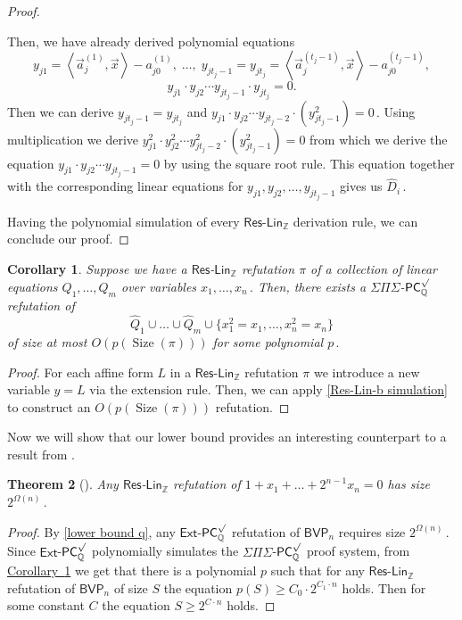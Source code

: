 \documentclass[11pt]{article}
\newcommand{\expref}[2]{\texorpdfstring{\hyperref[#2]{#1~\ref{#2}}}{#1~\ref{#2}}}
\newtheorem{theorem}{Theorem}[section]
\newtheorem{corollary}[theorem]{Corollary}
\newcommand{\Q}{{\mathbb Q}}
\newcommand{\Z}{{\mathbb Z}}
\DeclareMathOperator{\Size}{\mathrm{Size}}
\begin{document}
\begin{proof}
\begin{itemize}
    Then, we have already derived polynomial equations 
    $$
    y_{j 1} = \left\langle \vec a_j^{(1)}, \vec x \right \rangle - a_{j 0}^{(1)}, \; \ldots, \; y_{j t_{j} - 1} = y_{j t_j} = \left\langle \vec a_j^{(t_{j} - 1)}, \vec x \right \rangle - a_{j 0}^{(t_j - 1)},
    $$
    $$
    y_{j 1} \cdot y_{j 2} \cdots y_{j t_j - 1} \cdot y_{j t_j} = 0.
    $$
    Then we can derive $y_{j t_j - 1} = y_{j t_j}$ and %
$y_{j 1} \cdot y_{j 2} \cdots y_{j t_j - 2} \cdot (y_{j t_j - 1}^2) = 0\,.$ %
 Using multiplication we derive  $y_{j 1}^2 \cdot y_{j 2}^2 \cdots y_{j t_j - 2}^2 \cdot (y_{j t_j - 1}^2) = 0$ from which we derive the equation $y_{j 1} \cdot y_{j 2} \cdots y_{j t_j - 1} = 0$ by using the square root rule. This equation together with the corresponding linear equations for  $y_{j 1}, y_{j 2}, \ldots, y_{j t_j - 1}$ gives us %
$\widehat{D}_i\,.$ %
\end{itemize}
Having the polynomial simulation of every $\mathsf{Res}$-$\mathsf{Lin}_\Z$ derivation rule, we can conclude our proof.\end{proof}



\begin{corollary}\label{cor:SPS-PC sim of res-lin}
Suppose we have a  $\mathsf{Res}$-$\mathsf{Lin}_\Z$ refutation $\pi$ of a collection of linear equations $Q_1, \ldots, Q_m$ over variables %
$x_1, \ldots, x_n\,.$ %
  Then, there exists a $\Sigma \Pi \Sigma$-$\mathsf{PC}_\Q^{\surd}$ refutation of
$$
\widehat{Q}_1 \cup \ldots \cup \widehat{Q}_m  \cup \{x_1^2 = x_1, \ldots, x_n^2 = x_n\}
$$ 
of size at most $O(p(\Size(\pi)))$ for some polynomial %
$p\,.$ %
\end{corollary}
\begin{proof}
%
For each affine form $L$ in a $\mathsf{Res}$-$\mathsf{Lin}_\Z$ refutation $\pi$ we introduce a new variable $y = L$ via the extension rule. Then, we can apply  \autoref{Res-Lin-b simulation} to construct an $O(p(\Size(\pi)))$ refutation. %
\end{proof}

Now we will show that our lower bound provides an interesting counterpart to a result from  \cite{PT18_new}.

\begin{theorem}[\cite{PT18_new}]\label{Res-Lin lower bound}
%
Any $\mathsf{Res}$-$\mathsf{Lin}_\Z$ refutation of $1 + x_1 + \ldots + 2^{n - 1} x_n = 0$ has size %
$2^{\Omega(n)}\,.$ %
%
\end{theorem}

\begin{proof}
%
By \autoref{lower bound q}, any $\mathsf{Ext}$-$\mathsf{PC}_{\Q}^{\surd}$ refutation of $\mathsf{BVP}_n$  requires size %
$2^{\Omega(n)}\,.$ %
 Since $\mathsf{Ext}$-$\mathsf{PC}_{\Q}^{\surd}$ polynomially simulates the $\Sigma \Pi \Sigma$-$\mathsf{PC}_\Q^{\surd}$ proof system, from \expref{Corollary}{cor:SPS-PC sim of res-lin} we get that there is a polynomial $p$ such that for any  $\mathsf{Res}$-$\mathsf{Lin}_\Z$ refutation of $\mathsf{BVP}_n$ of size $S$ the equation $p(S) \ge C_0 \cdot 2^{C_1 \cdot n}$ holds. Then for some constant $C$ the equation $S \ge 2^{C \cdot n}$ holds. \end{proof} %
\end{document}
